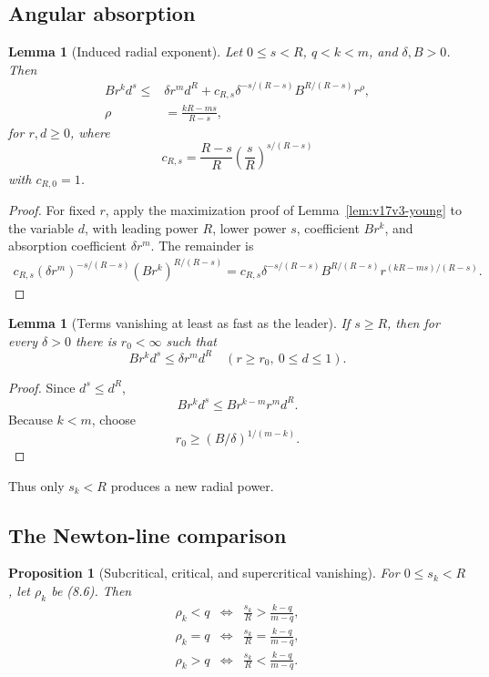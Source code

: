 \documentclass[11pt]{article}
\newtheorem{proposition}[theorem]{Proposition}
\newtheorem{lemma}[theorem]{Lemma}
\theoremstyle{remark}
\begin{document}
\subsection{Angular absorption}

\begin{lemma}[Induced radial exponent]
\label{lem:v17v8-induced}
Let \(0\leq s<R\), \(q<k<m\), and \(\delta,B>0\).  Then
\[
\begin{split}
 Br^kd^s
 \leq&
 \delta r^md^R+
 c_{R,s}\delta^{-s/(R-s)}
 B^{R/(R-s)}r^\rho,                                \tag{8.5}\\
 \rho&=\frac{kR-ms}{R-s},                          \tag{8.6}
\end{split}
\]
for \(r,d\geq0\), where
\[
 c_{R,s}
 =
 \frac{R-s}{R}
 \left(\frac{s}{R}\right)^{s/(R-s)}                \tag{8.7}
\]
with \(c_{R,0}=1\).
\end{lemma}

\begin{proof}
For fixed \(r\), apply the maximization proof of
Lemma~\ref{lem:v17v3-young} to the variable \(d\), with leading
power \(R\), lower power \(s\), coefficient \(Br^k\), and absorption
coefficient \(\delta r^m\).  The remainder is
\[
\begin{split}
 c_{R,s}(\delta r^m)^{-s/(R-s)}
 (Br^k)^{R/(R-s)}
 =
 c_{R,s}\delta^{-s/(R-s)}
 B^{R/(R-s)}
 r^{(kR-ms)/(R-s)}.
\end{split}
\]
\end{proof}

\begin{lemma}[Terms vanishing at least as fast as the leader]
\label{lem:v17v8-fast}
If \(s\geq R\), then for every \(\delta>0\) there is \(r_0<\infty\)
such that
\[
 Br^kd^s\leq\delta r^md^R
 \quad(r\geq r_0,\ 0\leq d\leq1).                  \tag{8.8}
\]
\end{lemma}

\begin{proof}
Since \(d^s\leq d^R\),
\[
 Br^kd^s\leq Br^{k-m}r^md^R.
\]
Because \(k<m\), choose
\[
 r_0\geq(B/\delta)^{1/(m-k)}.
\]
\end{proof}

Thus only \(s_k<R\) produces a new radial power.

\subsection{The Newton-line comparison}

\begin{proposition}[Subcritical, critical, and supercritical
vanishing]
\label{prop:v17v8-newton}
For \(0\leq s_k<R\), let \(\rho_k\) be (8.6).  Then
\[
\begin{array}{rcl}
\rho_k<q
&\Longleftrightarrow&
\displaystyle\frac{s_k}{R}>
\frac{k-q}{m-q},\\
\rho_k=q
&\Longleftrightarrow&
\displaystyle\frac{s_k}{R}=
\frac{k-q}{m-q},\\
\rho_k>q
&\Longleftrightarrow&
\displaystyle\frac{s_k}{R}<
\frac{k-q}{m-q}.
\end{array}                                         \tag{8.9}
\]
\end{proposition}
\end{document}
